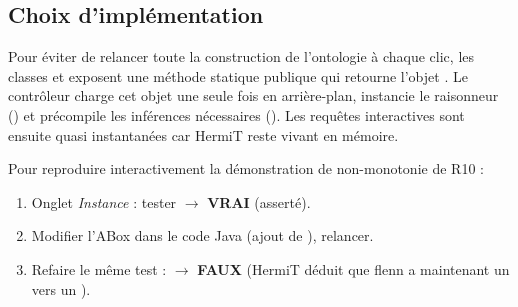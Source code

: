 \subsection{Choix d'implémentation}

Pour éviter de relancer toute la construction de l'ontologie à chaque clic,
les classes  et 
exposent une méthode statique publique  qui retourne
l'objet . Le contrôleur charge cet objet une seule fois en
arrière-plan, instancie le raisonneur ()
et précompile les inférences nécessaires
(). Les
requêtes interactives sont ensuite quasi instantanées car HermiT reste vivant
en mémoire.

\begin{tcolorbox}[notebox, title={Exemple de session pour démontrer R10}]
Pour reproduire interactivement la démonstration de non-monotonie de R10 :
\begin{enumerate}
  \item Onglet \emph{Instance} : tester
         $\to$ \textbf{VRAI} (asserté).
  \item Modifier l'ABox dans le code Java (ajout de
        ), relancer.
  \item Refaire le même test : $\to$ \textbf{FAUX} (HermiT déduit que flenn
        a maintenant un  vers un ).
\end{enumerate}
\end{tcolorbox}
